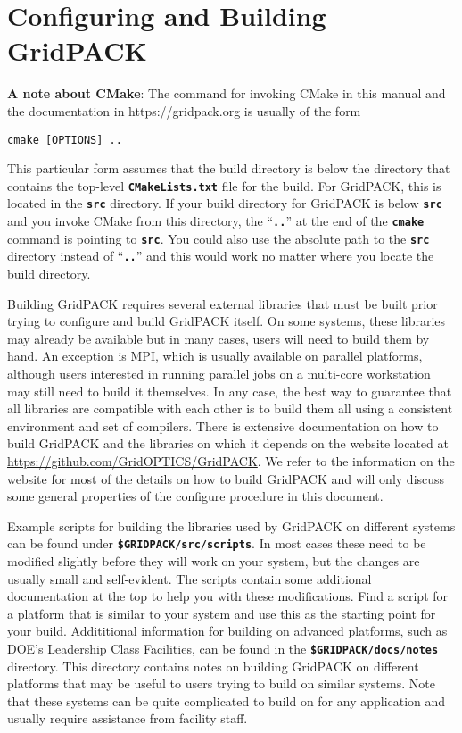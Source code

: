 \chapter{Configuring and Building GridPACK}

\textbf{A note about CMake}: The command for invoking CMake in this manual and the documentation in https://gridpack.org is usually of the form

{
\color{red}
\begin{Verbatim}[fontseries=b]
       cmake [OPTIONS] ..
\end{Verbatim}
}

This particular form assumes that the build directory is below the directory that contains the top-level \texttt{\textbf{CMakeLists.txt}} file for the build. For GridPACK, this is located in the \texttt{\textbf{src}} directory. If your build directory for GridPACK is below \texttt{\textbf{src}} and you invoke CMake from this directory, the ``\texttt{\textbf{..}}'' at the end of the \texttt{\textbf{cmake}} command is pointing to \texttt{\textbf{src}}. You could also use the absolute path to the \texttt{\textbf{src}} directory instead of ``\texttt{\textbf{..}}'' and this would work no matter where you locate the build directory.

Building GridPACK requires several external libraries that must be built prior trying to configure and build GridPACK itself. On some systems, these libraries may already be available but in many cases, users will need to build them by hand. An exception is MPI, which is usually available on parallel platforms, although users interested in running parallel jobs on a multi-core workstation may still need to build it themselves. In any case, the best way to guarantee that all libraries are compatible with each other is to build them all using a consistent environment and set of compilers. There is extensive documentation on how to build GridPACK and the libraries on which it depends on the website located at \href{https://github.com/GridOPTICS/GridPACK}{https://github.com/GridOPTICS/GridPACK}. We refer to the information on the website for most of the details on how to build GridPACK and will only discuss some general properties of the configure procedure in this document.

Example scripts for building the libraries used by GridPACK on different systems can be found under \texttt{\textbf{\$GRIDPACK/src/scripts}}. In most cases these need to be modified slightly before they will work on your system, but the changes are usually small and self-evident. The scripts contain some additional documentation at the top to help you with these modifications. Find a script for a platform that is similar to your system and use this as the starting point for your build. Addititional information for building on advanced platforms, such as DOE's Leadership Class Facilities, can be found in the \texttt{\textbf{\$GRIDPACK/docs/notes}} directory. This directory contains notes on building GridPACK on different platforms that may be useful to users trying to build on similar systems. Note that these systems can be quite complicated to build on for any application and usually require assistance from facility staff.

